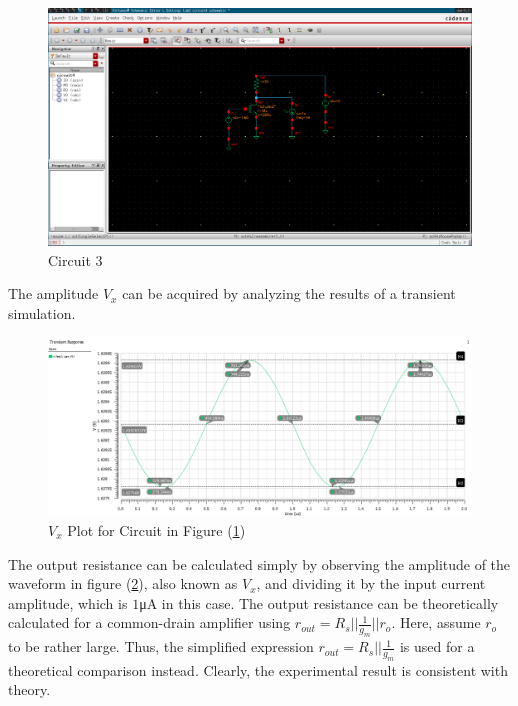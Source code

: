 \FloatBarrier

\begin{figure}[h!]
	\centering
	\includegraphics[scale=0.45]{../images/circuit4.PNG}
	\caption{Circuit 3}
	\label{fig:circuit3}
\end{figure}

\FloatBarrier
The amplitude $V_{x}$ can be acquired by analyzing the results of a transient simulation.

\FloatBarrier

\begin{figure}[h!]
	\centering
	\includegraphics[scale=0.45]{../images/sim3_vx.PNG}
	\caption{$V_{x}$ Plot for Circuit in Figure (\ref{fig:circuit3})}
	\label{fig:sim3_vx}
\end{figure}

\FloatBarrier

The output resistance can be calculated simply by observing the amplitude of the waveform in figure (\ref{fig:sim3_vx}), also known as $V_{x}$, and dividing it by the input current amplitude, which is $1$\si{\micro\ampere} in this case.
The output resistance can be theoretically calculated for a common-drain amplifier using $r_{out} = R_{s} || \frac{1}{g_{m}} || r_{o}$.
Here, assume $r_{o}$ to be rather large.
Thus, the simplified expression $r_{out} = R_{s} || \frac{1}{g_{m}}$ is used for a theoretical comparison instead.
Clearly, the experimental result is consistent with theory.

